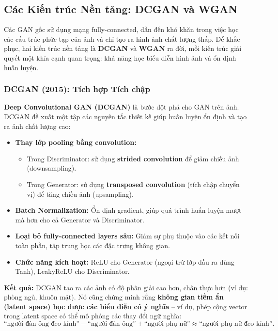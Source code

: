 \subsection{Các Kiến trúc Nền tảng: DCGAN và WGAN}
\label{subsec:dcgan_wgan}

Các GAN gốc sử dụng mạng fully-connected, dẫn đến khó khăn trong việc học các cấu trúc phức tạp của ảnh và chỉ tạo ra hình ảnh chất lượng thấp. Để khắc phục, hai kiến trúc nền tảng là \textbf{DCGAN} và \textbf{WGAN} ra đời, mỗi kiến trúc giải quyết một khía cạnh quan trọng: khả năng học biểu diễn hình ảnh và ổn định huấn luyện.

\subsubsection{DCGAN (2015): Tích hợp Tích chập}
\label{subsubsec:dcgan}

\textbf{Deep Convolutional GAN (DCGAN)} \cite{Radford2015} là bước đột phá cho GAN trên ảnh. DCGAN đề xuất một tập các nguyên tắc thiết kế giúp huấn luyện ổn định và tạo ra ảnh chất lượng cao:

\begin{itemize}
	\item \textbf{Thay lớp pooling bằng convolution:}  
	\begin{itemize}
		\item Trong Discriminator: sử dụng \textbf{strided convolution} để giảm chiều ảnh (downsampling).  
		\item Trong Generator: sử dụng \textbf{transposed convolution} (tích chập chuyển vị) để tăng chiều ảnh (upsampling).
	\end{itemize}
	\item \textbf{Batch Normalization:} Ổn định gradient, giúp quá trình huấn luyện mượt mà hơn cho cả Generator và Discriminator.
	\item \textbf{Loại bỏ fully-connected layers sâu:} Giảm sự phụ thuộc vào các kết nối toàn phần, tập trung học các đặc trưng không gian.
	\item \textbf{Chức năng kích hoạt:} ReLU cho Generator (ngoại trừ lớp đầu ra dùng Tanh), LeakyReLU cho Discriminator.
\end{itemize}

\textbf{Kết quả:}  
DCGAN tạo ra các ảnh có độ phân giải cao hơn, chân thực hơn (ví dụ: phòng ngủ, khuôn mặt). Nó cũng chứng minh rằng \textbf{không gian tiềm ẩn (latent space) học được các biểu diễn có ý nghĩa} – ví dụ, phép cộng vector trong latent space có thể mô phỏng các thay đổi ngữ nghĩa:  
\[
\text{“người đàn ông đeo kính”} - \text{“người đàn ông”} + \text{“người phụ nữ”} \approx \text{“người phụ nữ đeo kính”}.
\]

